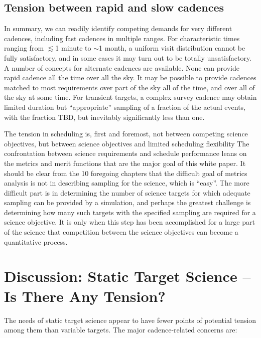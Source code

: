 \subsection{Tension between rapid and slow cadences}

In summary, we can readily identify competing demands for very different
cadences, including fast cadences in multiple ranges. For characteristic
times ranging from  $\lesssim$1 minute to $\sim$1 month, a uniform
visit distribution cannot be fully satisfactory, and in some cases it
may turn out to be totally unsatisfactory.  A number of concepts for
alternate cadences are available.  None can provide rapid cadence all
the time over all the sky. It may be possible to provide cadences
matched to most requirements over part of the sky all of the time, and
over all of the sky at some time. For transient targets, a complex
survey cadence may obtain limited duration but ``appropriate'' sampling
of a fraction of the actual events, with the fraction TBD, but
inevitably significantly less than one.

The tension in scheduling is, first and foremost, not between competing
science objectives, but between science objectives and limited
scheduling flexibility The confrontation between science requirements
and schedule performance leans on the metrics and merit functions that
are the major goal of this white paper.  It should be clear from the 10
foregoing chapters that the difficult goal of metrics analysis is not in
describing sampling for the science, which is ``easy''.  The more
difficult part is in determining the number of science targets for which
adequate sampling can be provided by a simulation, and perhaps the
greatest challenge is determining how many such targets with the
specified sampling are required for a science objective.  It is only
when this step has been accomplished for a large part of the science
that competition between the science objectives can become a
quantitative process.


\section{Discussion: Static Target Science -- Is There Any Tension?}

The needs of static target science appear to have fewer points of
potential tension among them than variable targets.  The major
cadence-related concerns are:

